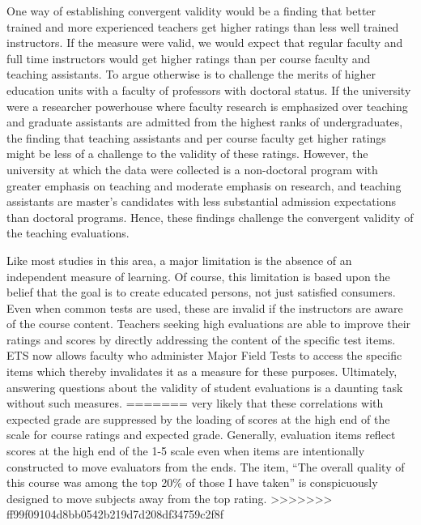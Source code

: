 \documentclass[,man]{apa6}
\theoremstyle{definition}
\theoremstyle{definition}
\theoremstyle{definition}
\theoremstyle{remark}
\begin{document}
One way of establishing convergent validity would be a finding that
better trained and more experienced teachers get higher ratings than
less well trained instructors. If the measure were valid, we would
expect that regular faculty and full time instructors would get higher
ratings than per course faculty and teaching assistants. To argue
otherwise is to challenge the merits of higher education units with a
faculty of professors with doctoral status. If the university were a
researcher powerhouse where faculty research is emphasized over teaching
and graduate assistants are admitted from the highest ranks of
undergraduates, the finding that teaching assistants and per course
faculty get higher ratings might be less of a challenge to the validity
of these ratings. However, the university at which the data were
collected is a non-doctoral program with greater emphasis on teaching
and moderate emphasis on research, and teaching assistants are master's
candidates with less substantial admission expectations than doctoral
programs. Hence, these findings challenge the convergent validity of the
teaching evaluations.

Like most studies in this area, a major limitation is the absence of an
independent measure of learning. Of course, this limitation is based
upon the belief that the goal is to create educated persons, not just
satisfied consumers. Even when common tests are used, these are invalid
if the instructors are aware of the course content. Teachers seeking
high evaluations are able to improve their ratings and scores by
directly addressing the content of the specific test items. ETS now
allows faculty who administer Major Field Tests to access the specific
items which thereby invalidates it as a measure for these purposes.
Ultimately, answering questions about the validity of student
evaluations is a daunting task without such measures.
=======
very likely that these correlations with expected grade are suppressed
by the loading of scores at the high end of the scale for course ratings
and expected grade. Generally, evaluation items reflect scores at the
high end of the 1-5 scale even when items are intentionally constructed
to move evaluators from the ends. The item, \enquote{The overall quality
of this course was among the top 20\% of those I have taken} is
conspicuously designed to move subjects away from the top rating.
>>>>>>> ff99f09104d8bb0542b219d7d208df34759c2f8f
\end{document}
